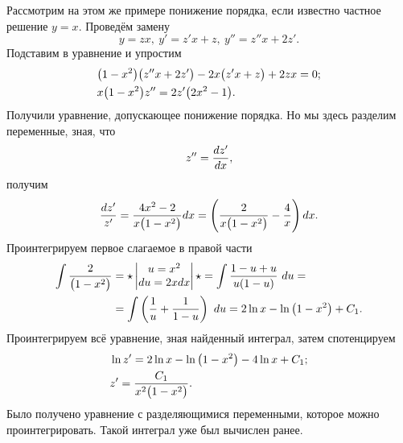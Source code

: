         Рассмотрим на этом же примере понижение порядка, если известно частное решение $ y = x $. Проведём замену
        \[
            y = zx, ~ y' = z'x + z, ~ y'' = z''x + 2z'.
        \]
        Подставим в уравнение и упростим
        \[
            \begin{split}
                &\bigl( 1 - x^2 \bigr)\bigl( z''x + 2z' \bigr) - 2x\bigl( z'x + z \bigr) + 2zx = 0; \\
                &x \bigl( 1 - x^2 \bigr) z'' = 2z' \bigl( 2x^2 - 1 \bigr).
            \end{split}
        \]
        Получили уравнение, допускающее понижение порядка. Но мы здесь разделим переменные, зная, что
        \[
            z'' = \dfrac{d z'}{d x},
        \]
        получим
        \[
            \dfrac{dz'}{z'} = \dfrac{4x^2 - 2}{x \bigl( 1 - x^2 \bigr)} dx = \left( \dfrac{2}{x\bigl( 1 - x^2 \bigr)} - \dfrac{4}{x} \right) dx.
        \]
        Проинтегрируем первое слагаемое в правой части
        \[
            \begin{split}
                \int \dfrac{2}{\bigl( 1 - x^2 \bigr)} &= \star
                \begin{vmatrix}
                    u = x^2 \\
                    du = 2x dx
                \end{vmatrix}
                \star = \int \dfrac{1 - u + u}{u(1 - u)} ~ du = \\ &= \int \left( \dfrac{1}{u} + \dfrac{1}{1 - u} \right) ~ du = 2\ln{x} - \ln{ \bigl( 1 - x^2 \bigr) } + C_1.
            \end{split}
        \]
        Проинтегрируем всё уравнение, зная найденный интеграл, затем спотенцируем
        \[
            \begin{split}
                &\ln{z'} = 2\ln{x} - \ln{ \bigl( 1 - x^2 \bigr) } - 4\ln{x} + C_1; \\
                & z' = \dfrac{C_1}{x^2 \bigl( 1 - x^2 \bigr)}.
            \end{split}
        \]
        Было получено уравнение с разделяющимися переменными, которое можно проинтегрировать. Такой интеграл уже был вычислен ранее.
